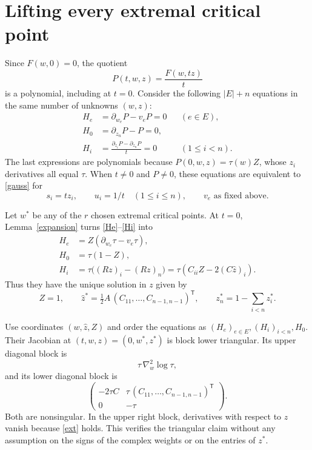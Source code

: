 \documentclass[11pt]{article}
\begin{document}
\section*{Lifting every extremal critical point}
Since $F(w,0)=0$, the quotient
\[
 P(t,w,z)=\frac{F(w,tz)}{t}
\]
is a polynomial, including at $t=0$. Consider the following $|E|+n$
equations in the same number of unknowns $(w,z)$:
\begin{align}
 H_e&=\partial_{w_e}P-v_eP=0 &&(e\in E),\label{He}\\
 H_0&=\partial_{z_n}P-P=0,\label{H0}\\
 H_i&=\frac{\partial_{z_i}P-\partial_{z_n}P}{t}=0
                         &&(1\leq i<n).\label{Hi}
\end{align}
The last expressions are polynomials because
$P(0,w,z)=\tau(w)Z$, whose $z_i$ derivatives all equal $\tau$.
When $t\ne0$ and $P\ne0$, these equations are equivalent to
\eqref{gauss} for
\begin{equation}\label{data}
 s_i=tz_i,\qquad u_i=1/t\quad(1\leq i\leq n),
 \qquad v_e\text{ as fixed above}.
\end{equation}

Let $w^*$ be any of the $r$ chosen extremal critical points. At $t=0$,
Lemma~\ref{expansion} turns \eqref{He}--\eqref{Hi} into
\begin{align*}
 H_e&=Z(\partial_{w_e}\tau-v_e\tau),\\
 H_0&=\tau(1-Z),\\
 H_i&=\tau\bigl((Rz)_i-(Rz)_n\bigr)
     =\tau\left(C_{ii}Z-2(C\widehat z)_i\right).
\end{align*}
Thus they have the unique solution in $z$ given by
\begin{equation}\label{zstar}
 Z=1,\qquad
 \widehat z^*=\tfrac12 A\,(C_{11},\ldots,C_{n-1,n-1})^{\mathsf T},
 \qquad z_n^*=1-\sum_{i<n}z_i^*.
\end{equation}

Use coordinates $(w,\widehat z,Z)$ and order the equations as
$(H_e)_{e\in E},(H_i)_{i<n},H_0$. Their Jacobian at
$(t,w,z)=(0,w^*,z^*)$ is block lower triangular. Its upper diagonal
block is
\[
 \tau\,\nabla_w^2\log\tau,
\]
and its lower diagonal block is
\begin{equation}\label{block}
 \begin{pmatrix}
 -2\tau C&\tau\,(C_{11},\ldots,C_{n-1,n-1})^{\mathsf T}\\
 0&-\tau
 \end{pmatrix}.
\end{equation}
Both are nonsingular. In the upper right block, derivatives with respect
to $z$ vanish because \eqref{ext} holds. This verifies the triangular
claim without any assumption on the signs of the complex weights or
on the entries of $z^*$.
\end{document}
